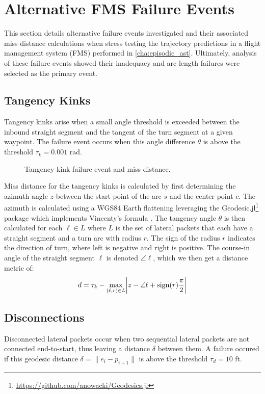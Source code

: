 \chapter{Alternative FMS Failure Events}\label{cha:fms_events}
This section details alternative failure events investigated and their associated miss distance calculations when stress testing the trajectory predictions in a flight management system (FMS) performed in \cref{cha:episodic_ast}.
Ultimately, analysis of these failure events showed their inadequacy and arc length failures were selected as the primary event.

\section{Tangency Kinks}
Tangency kinks arise when a small angle threshold is exceeded between the inbound straight segment and the tangent of the turn segment at a given waypoint. The failure event occurs when this angle difference $\theta$ is above the threshold $\tau_k = 0.001$ \si{\radian}.

\begin{figure}[!ht]
\centering
\resizebox{0.5\columnwidth}{!}{}
\caption{Tangency kink failure event and miss distance.}
\label{fig:tangency_kink}
\end{figure}

Miss distance for the tangency kinks is calculated by first determining the azimuth angle $z$ between the start point of the arc $s$ and the center point $c$. The azimuth is calculated using a WGS84 Earth flattening leveraging the Geodesic.jl\footnote{\url{https://github.com/anowacki/Geodesics.jl}} package which implements Vincenty's formula  \cite{vincenty}. The tangency angle $\theta$ is then calculated for each $\ell \in L$ where $L$ is the set of lateral packets that each have a straight segment and a turn arc with radius $r$. The sign of the radius $r$ indicates the direction of turn, where left is negative and right is positive. The course-in angle of the straight segment $\ell$ is denoted $\angle \ell$, which we then get a distance metric of:
\begin{equation*}
    d = \tau_k - \max\limits_{(\ell,r) \in L} \abs{z - \angle \ell + \operatorname{sign}(r)\frac{\pi}{2}}
\end{equation*}
\phantom{}

\vspace{-6mm}
\section{Disconnections}
Disconnected lateral packets occur when two sequential lateral packets are not connected end-to-start, thus leaving a distance $\delta$ between them. A failure occured if this geodesic distance $\delta = \lVert e_i - p_{i+1} \rVert$ is above the threshold $\tau_d = 10$ \si{ft}.

